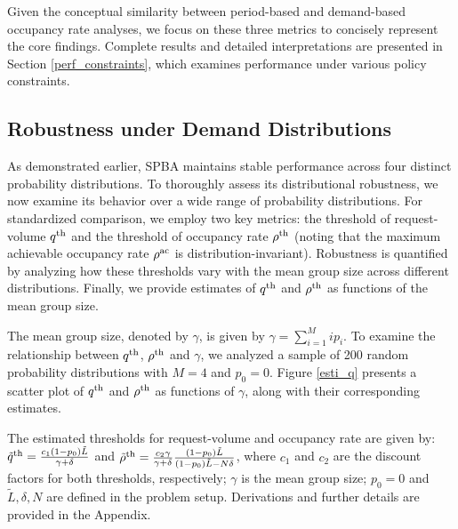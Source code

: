 Given the conceptual similarity between period-based and demand-based occupancy rate analyses, we focus on these three metrics to concisely represent the core findings. Complete results and detailed interpretations are presented in Section \ref{perf_constraints}, which examines performance under various policy constraints.


\subsection{Robustness under Demand Distributions}
As demonstrated earlier, SPBA maintains stable performance across four distinct probability distributions. To thoroughly assess its distributional robustness, we now examine its behavior over a wide range of probability distributions. For standardized comparison, we employ two key metrics: the threshold of request-volume $q^{\textup{th}}$ and the threshold of occupancy rate $\rho^{\textup{th}}$ (noting that the maximum achievable occupancy rate $\rho^{\textup{ac}}$ is distribution-invariant).
Robustness is quantified by analyzing how these thresholds vary with the mean group size across different distributions. Finally, we provide estimates of $q^{\textup{th}}$ and $\rho^{\textup{th}}$ as functions of the mean group size.


The mean group size, denoted by $\gamma$, is given by $\gamma = \sum_{i=1}^{M} i p_i$.
To examine the relationship between $q^{\textup{th}}$, $\rho^{\textup{th}}$ and $\gamma$, we analyzed a sample of 200 random probability distributions with $M=4$ and $p_0=0$. Figure \ref{esti_q} presents a scatter plot of $q^{\textup{th}}$ and $\rho^{\textup{th}}$ as functions of $\gamma$, along with their corresponding estimates.

The estimated thresholds for request-volume and occupancy rate are given by:
$\tilde{q}^{\textup{th}} =  \frac{c_1 (1-p_0) \tilde{L}}{\gamma + \delta}$ and $\tilde{\rho}^{\textup{th}} = \frac{c_2 \gamma}{\gamma +\delta} \frac{(1-p_0) \tilde{L}}{(1-p_0) \tilde{L}-N \delta}$, where 
 $c_1$ and $c_2$ are the discount factors for both thresholds, respectively; $\gamma$ is the mean group size; $p_0 =0$ and $\tilde{L}, \delta, N$ are defined in the problem setup. Derivations and further details are provided in the Appendix.

